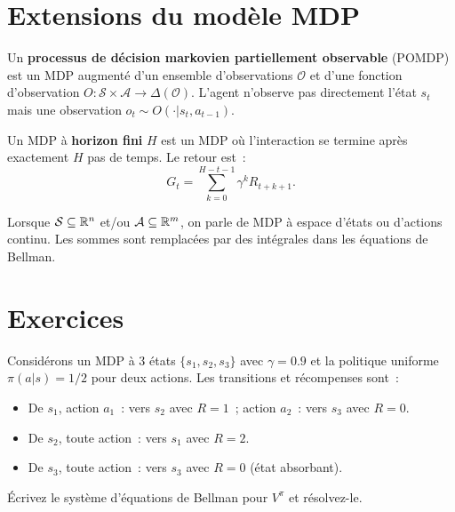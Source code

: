 \section{Extensions du mod\`ele MDP}

\begin{definition}[POMDP]
Un \textbf{processus de d\'ecision markovien partiellement observable} (POMDP)
est un MDP augment\'e d'un ensemble d'observations $\mathcal{O}$ et d'une
fonction d'observation $O : \mathcal{S} \times \mathcal{A} \to \Delta(\mathcal{O})$.
L'agent n'observe pas directement l'\'etat $s_t$ mais une observation $o_t \sim O(\cdot | s_t, a_{t-1})$.
\end{definition}

\begin{definition}
Un MDP \`a \textbf{horizon fini} $H$ est un MDP o\`u l'interaction se termine
apr\`es exactement $H$ pas de temps. Le retour est~:
\[
    G_t = \sum_{k=0}^{H-t-1} \gamma^k R_{t+k+1}.
\]
\end{definition}

\begin{definition}
Lorsque $\mathcal{S} \subseteq \mathbb{R}^n$ et/ou $\mathcal{A} \subseteq \mathbb{R}^m$, on parle
de MDP \`a espace d'\'etats ou d'actions continu. Les sommes sont remplac\'ees par
des int\'egrales dans les \'equations de Bellman.
\end{definition}

\section{Exercices}

\begin{exercice}
Consid\'erons un MDP \`a 3 \'etats $\{s_1, s_2, s_3\}$ avec $\gamma = 0.9$ et
la politique uniforme $\pi(a|s) = 1/2$ pour deux actions. Les transitions
et r\'ecompenses sont~:
\begin{itemize}
    \item De $s_1$, action $a_1$~: vers $s_2$ avec $R=1$~; action $a_2$~: vers $s_3$ avec $R=0$.
    \item De $s_2$, toute action~: vers $s_1$ avec $R=2$.
    \item De $s_3$, toute action~: vers $s_3$ avec $R=0$ (\'etat absorbant).
\end{itemize}
\'Ecrivez le syst\`eme d'\'equations de Bellman pour $V^\pi$ et r\'esolvez-le.
\end{exercice}

